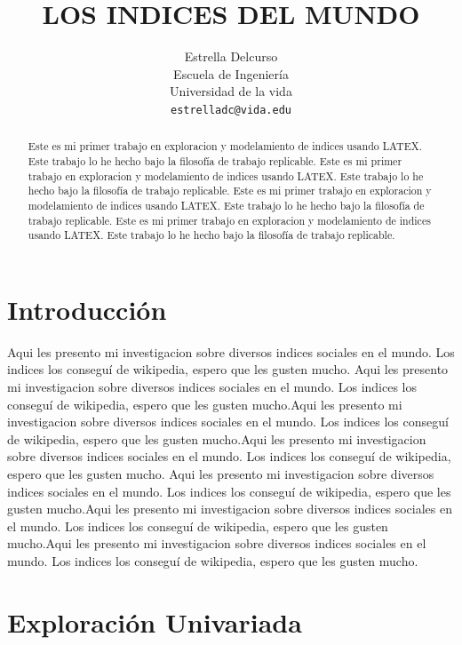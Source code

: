 \documentclass{article}
\title{LOS INDICES DEL MUNDO}
\author{
        Estrella Delcurso\\
        Escuela de Ingeniería\\
        Universidad de la vida\\
        \texttt{estrelladc@vida.edu}
}
\date{}
\begin{document}


\maketitle


\begin{abstract}
Este es mi primer trabajo en exploracion y modelamiento de indices usando LATEX. Este trabajo lo he hecho bajo la filosofía de trabajo replicable. Este es mi primer trabajo en exploracion y modelamiento de indices usando LATEX. Este trabajo lo he hecho bajo la filosofía de trabajo replicable. Este es mi primer trabajo en exploracion y modelamiento de indices usando LATEX. Este trabajo lo he hecho bajo la filosofía de trabajo replicable. Este es mi primer trabajo en exploracion y modelamiento de indices usando LATEX. Este trabajo lo he hecho bajo la filosofía de trabajo replicable.
\end{abstract}

\section*{Introducción}

Aqui les presento mi investigacion sobre diversos indices sociales en el mundo. Los indices los conseguí de wikipedia, espero que les gusten mucho. Aqui les presento mi investigacion sobre diversos indices sociales en el mundo. Los indices los conseguí de wikipedia, espero que les gusten mucho.Aqui les presento mi investigacion sobre diversos indices sociales en el mundo. Los indices los conseguí de wikipedia, espero que les gusten mucho.Aqui les presento mi investigacion sobre diversos indices sociales en el mundo. Los indices los conseguí de wikipedia, espero que les gusten mucho.
Aqui les presento mi investigacion sobre diversos indices sociales en el mundo. Los indices los conseguí de wikipedia, espero que les gusten mucho.Aqui les presento mi investigacion sobre diversos indices sociales en el mundo. Los indices los conseguí de wikipedia, espero que les gusten mucho.Aqui les presento mi investigacion sobre diversos indices sociales en el mundo. Los indices los conseguí de wikipedia, espero que les gusten mucho.



\section{Exploración Univariada}
\end{document}
